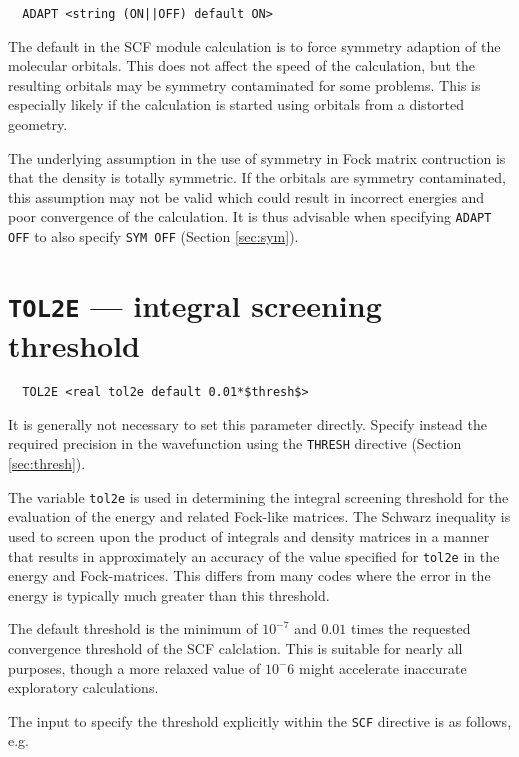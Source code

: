 \begin{verbatim}
  ADAPT <string (ON||OFF) default ON>
\end{verbatim}

The default in the SCF module calculation is to force symmetry
adaption of the molecular orbitals. This does not affect the speed of
the calculation, but the resulting orbitals may be symmetry
contaminated for some problems.  This is especially likely if the
calculation is started using orbitals from a distorted geometry.

The underlying assumption in the use of symmetry in Fock matrix
contruction is that the density is totally symmetric.  If the orbitals
are symmetry contaminated, this assumption may not be valid which
could result in incorrect energies and poor convergence of the
calculation.  It is thus advisable when specifying \verb+ADAPT OFF+ to
also specify \verb+SYM OFF+ (Section \ref{sec:sym}).

\section{{\tt TOL2E} --- integral screening threshold}
\label{sec:tol2e}

\begin{verbatim}
  TOL2E <real tol2e default 0.01*$thresh$>
\end{verbatim}

It is generally not necessary to set this parameter directly.  Specify
instead the required precision in the wavefunction using the
\verb+THRESH+ directive (Section \ref{sec:thresh}).

The variable \verb+tol2e+ is used in determining the integral
screening threshold for the evaluation of the energy and related
Fock-like matrices.  The Schwarz inequality is used to screen upon the
product of integrals and density matrices in a manner that results in
approximately an accuracy of the value specified for \verb+tol2e+ in
the energy and Fock-matrices.  This differs from many codes where the
error in the energy is typically much greater than this threshold.

The default threshold is the minimum of $10^{-7}$ and $0.01$ times the
requested convergence threshold of the SCF calclation.  This is
suitable for nearly all purposes, though a more relaxed value of 
$10^-6$ might accelerate inaccurate exploratory calculations.

The input to specify the threshold explicitly within the
\verb+SCF+ directive is as follows, e.g.


